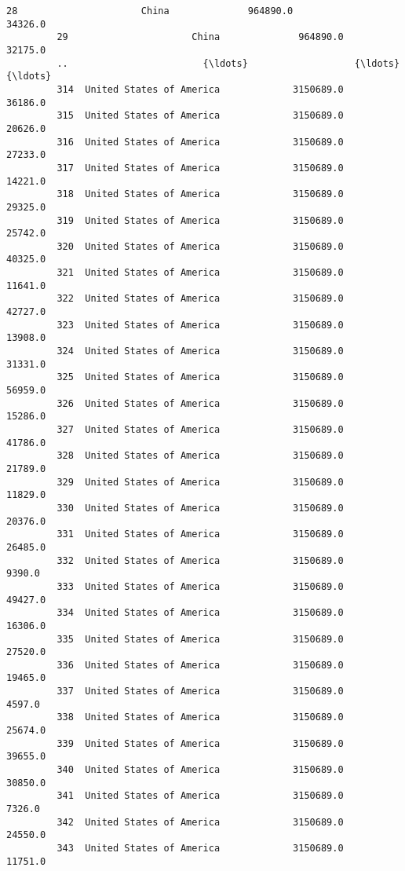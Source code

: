 \documentclass[11pt]{article}
\begin{document}
\begin{Verbatim}[commandchars=\\\{\}]
         28                      China              964890.0                  34326.0   
         29                      China              964890.0                  32175.0   
         ..                        {\ldots}                   {\ldots}                      {\ldots}   
         314  United States of America             3150689.0                  36186.0   
         315  United States of America             3150689.0                  20626.0   
         316  United States of America             3150689.0                  27233.0   
         317  United States of America             3150689.0                  14221.0   
         318  United States of America             3150689.0                  29325.0   
         319  United States of America             3150689.0                  25742.0   
         320  United States of America             3150689.0                  40325.0   
         321  United States of America             3150689.0                  11641.0   
         322  United States of America             3150689.0                  42727.0   
         323  United States of America             3150689.0                  13908.0   
         324  United States of America             3150689.0                  31331.0   
         325  United States of America             3150689.0                  56959.0   
         326  United States of America             3150689.0                  15286.0   
         327  United States of America             3150689.0                  41786.0   
         328  United States of America             3150689.0                  21789.0   
         329  United States of America             3150689.0                  11829.0   
         330  United States of America             3150689.0                  20376.0   
         331  United States of America             3150689.0                  26485.0   
         332  United States of America             3150689.0                   9390.0   
         333  United States of America             3150689.0                  49427.0   
         334  United States of America             3150689.0                  16306.0   
         335  United States of America             3150689.0                  27520.0   
         336  United States of America             3150689.0                  19465.0   
         337  United States of America             3150689.0                   4597.0   
         338  United States of America             3150689.0                  25674.0   
         339  United States of America             3150689.0                  39655.0   
         340  United States of America             3150689.0                  30850.0   
         341  United States of America             3150689.0                   7326.0   
         342  United States of America             3150689.0                  24550.0   
         343  United States of America             3150689.0                  11751.0   
         

\end{Verbatim}
\end{document}
